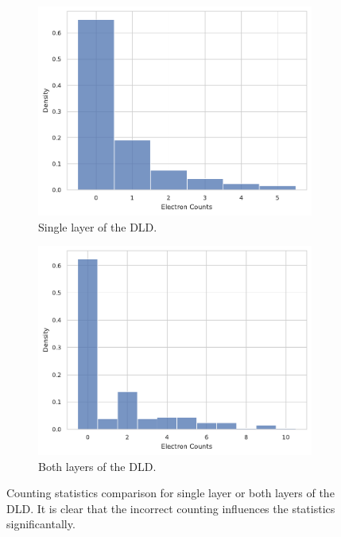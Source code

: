 \begin{figure}
    \centering
    \begin{subfigure}[t]{0.49\linewidth}
        \centering
        \includegraphics[width=\linewidth]{images/hist_counts_1_layer.pdf}
        \caption{Single layer of the \gls{DLD}.}
        \label{fig:grir-stats-1-layer}
    \end{subfigure}
    \hfill
    \begin{subfigure}[t]{0.49\linewidth}
        \centering
        \includegraphics[width=\linewidth]{images/hist_counts_2_layer.pdf}
        \caption{Both layers of the \gls{DLD}.}
        \label{fig:grir-stats-2-layer}
    \end{subfigure}
    \caption{Counting statistics comparison for single layer or both layers of the \gls{DLD}. It is clear that the incorrect counting influences the statistics significantally.}
    \label{fig:grir-stats-dld-comparison}
\end{figure}

